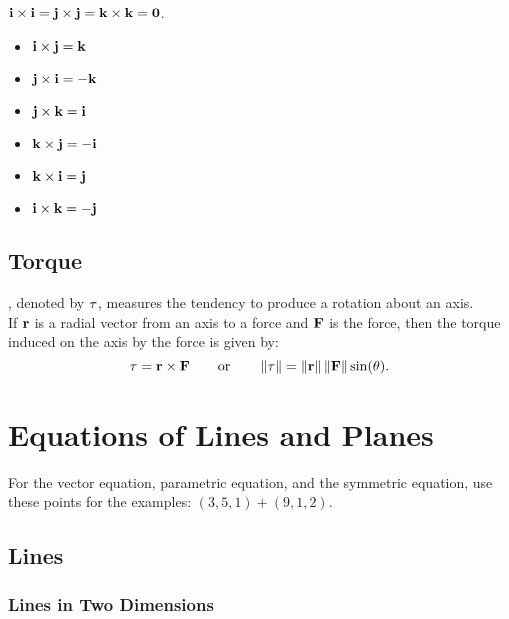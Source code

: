 \(\mathbf{i} \times \mathbf{i} = \mathbf{j} \times \mathbf{j} = \mathbf{k} \times \mathbf{k} = \mathbf{0}\).
\begin{multicols}{2}
    \begin{itemize}
        \item \(\mathbf{i} \times \mathbf{j} = \mathbf{k}\) 
        \item \(\mathbf{j} \times \mathbf{i} = -\mathbf{k}\)
        \item \(\mathbf{j} \times \mathbf{k} = \mathbf{i}\) 
        \item \(\mathbf{k} \times \mathbf{j} = -\mathbf{i}\)
        \item \(\mathbf{k} \times \mathbf{i} = \mathbf{j}\) 
        \item \(\mathbf{i} \times \mathbf{k} = -\mathbf{j}\)
    \end{itemize}
\end{multicols}

\subsection{Torque}

, denoted by \(\mathbf{\tau}\), measures the tendency to produce a rotation about an axis. \\

If \(\mathbf{r}\) is a radial vector from an axis to a force and \(\mathbf{F}\) is the force, then the torque induced on the axis by the force is given by:
\[
    \mathbf{\tau} = \mathbf{r} \times \mathbf{F} \qquad \text{or} \qquad \left\lVert \mathbf{\mathbf{\tau}}\right\rVert = \left\lVert \mathbf{r}\right\rVert\left\lVert \mathbf{F}\right\rVert\sin(\theta).
\]


\newpage

\section{Equations of Lines and Planes}

For the vector equation, parametric equation, and the symmetric equation, use these points for the examples: \((3,5,1) + (9,1,2)\).

\subsection{Lines}

\subsubsection{Lines in Two Dimensions}

